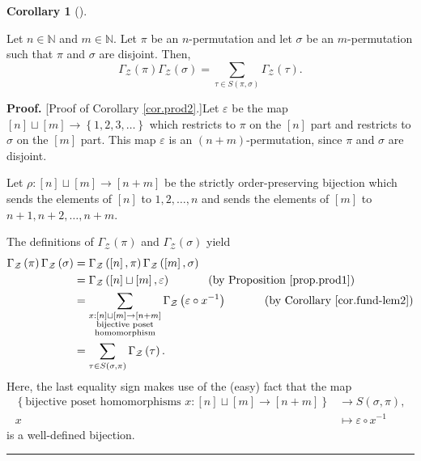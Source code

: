 \documentclass[numbers=enddot,12pt,final,onecolumn,notitlepage]{scrartcl}%
\theoremstyle{definition}
\newtheorem{coro}[theo]{Corollary}
\newenvironment{corollary}[1][]
{\begin{coro}[#1]\begin{leftbar}}
{\end{leftbar}\end{coro}}
\newenvironment{proof}[1][Proof]{\noindent\textbf{#1.} }{\ \rule{0.5em}{0.5em}}
\let\sumnonlimits\sum
\renewcommand{\sum}{\sumnonlimits\limits}
\begin{document}
\begin{corollary}
\label{cor.prod2}Let $n\in\mathbb{N}$ and $m\in\mathbb{N}$. Let $\pi$ be an
$n$-permutation and let $\sigma$ be an $m$-permutation such that $\pi$ and
$\sigma$ are disjoint. Then,%
\[
\Gamma_{\mathcal{Z}}\left(  \pi\right)  \Gamma_{\mathcal{Z}}\left(
\sigma\right)  =\sum_{\tau\in S\left(  \pi,\sigma\right)  }\Gamma
_{\mathcal{Z}}\left(  \tau\right)  .
\]

\end{corollary}

\begin{proof}
[Proof of Corollary \ref{cor.prod2}.]Let $\varepsilon$ be the map $\left[
n\right]  \sqcup\left[  m\right]  \rightarrow\left\{  1,2,3,\ldots\right\}  $
which restricts to $\pi$ on the $\left[  n\right]  $ part and restricts to
$\sigma$ on the $\left[  m\right]  $ part. This map $\varepsilon$ is an
$\left(  n+m\right)  $-permutation, since $\pi$ and $\sigma$ are disjoint.

Let $\rho:\left[  n\right]  \sqcup\left[  m\right]  \rightarrow\left[
n+m\right]  $ be the strictly order-preserving bijection which sends the
elements of $\left[  n\right]  $ to $1,2,\ldots,n$ and sends the elements of
$\left[  m\right]  $ to $n+1,n+2,\ldots,n+m$.

The definitions of $\Gamma_{\mathcal{Z}}\left(  \pi\right)  $ and
$\Gamma_{\mathcal{Z}}\left(  \sigma\right)  $ yield%
\begin{align*}
\Gamma_{\mathcal{Z}}\left(  \pi\right)  \Gamma_{\mathcal{Z}}\left(
\sigma\right)   &  =\Gamma_{\mathcal{Z}}\left(  \left[  n\right]  ,\pi\right)
\Gamma_{\mathcal{Z}}\left(  \left[  m\right]  ,\sigma\right) \\
&  =\Gamma_{\mathcal{Z}}\left(  \left[  n\right]  \sqcup\left[  m\right]
,\varepsilon\right)  \ \ \ \ \ \ \ \ \ \ \left(  \text{by Proposition
\ref{prop.prod1}}\right) \\
&  =\sum_{\substack{x:\left[  n\right]  \sqcup\left[  m\right]  \rightarrow
\left[  n+m\right]  \\\text{bijective poset}\\\text{homomorphism}}%
}\Gamma_{\mathcal{Z}}\left(  \varepsilon\circ x^{-1}\right)
\ \ \ \ \ \ \ \ \ \ \left(  \text{by Corollary \ref{cor.fund-lem2}}\right) \\
&  =\sum_{\tau\in S\left(  \sigma,\pi\right)  }\Gamma_{\mathcal{Z}}\left(
\tau\right)  .
\end{align*}
Here, the last equality sign makes use of the (easy) fact that the map%
\begin{align*}
\left\{  \text{bijective poset homomorphisms }x:\left[  n\right]
\sqcup\left[  m\right]  \rightarrow\left[  n+m\right]  \right\}   &
\rightarrow S\left(  \sigma,\pi\right)  ,\\
x  &  \mapsto\varepsilon\circ x^{-1}%
\end{align*}
is a well-defined bijection.
\end{proof}
\end{document}
